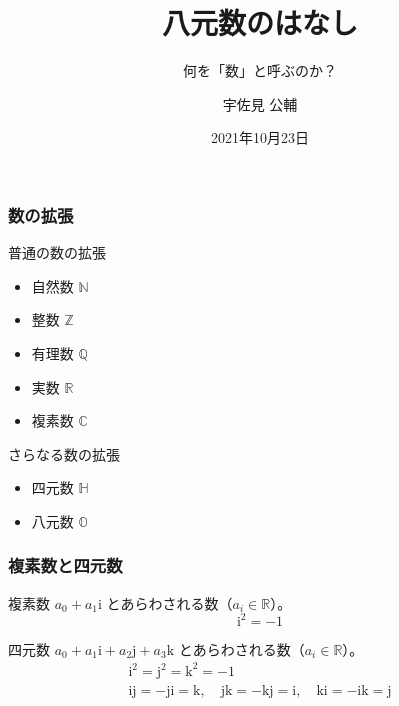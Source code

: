 \documentclass{beamer}
\title{八元数のはなし}
\subtitle{何を「数」と呼ぶのか？}
\author{宇佐見 公輔}
\date{2021年10月23日}
\newcommand{\ii}{\mathrm{i}}
\newcommand{\jj}{\mathrm{j}}
\newcommand{\kk}{\mathrm{k}}
\begin{document}
\maketitle

\begin{frame}
    \frametitle{数の拡張}

    \begin{block}{普通の数の拡張}
        \begin{itemize}
            \item 自然数 \(\mathbb{N}\)
            \item 整数 \(\mathbb{Z}\)
            \item 有理数 \(\mathbb{Q}\)
            \item 実数 \(\mathbb{R}\)
            \item 複素数 \(\mathbb{C}\)
        \end{itemize}
    \end{block}

    \begin{block}{さらなる数の拡張}
        \begin{itemize}
            \item 四元数 \(\mathbb{H}\)
            \item 八元数 \(\mathbb{O}\)
        \end{itemize}
    \end{block}
\end{frame}

\begin{frame}
    \frametitle{複素数と四元数}

    \begin{block}{複素数}
        \(a_0 + a_1 \ii\)
        とあらわされる数（\(a_i \in \mathbb{R}\)）。
        \[
            \ii^2 = -1
        \]
    \end{block}

    \begin{block}{四元数}
        \(a_0 + a_1 \ii + a_2 \jj + a_3 \kk\)
        とあらわされる数（\(a_i \in \mathbb{R}\)）。
        \begin{gather*}
            \ii^2 = \jj^2 = \kk^2 = -1 \\
            \ii \jj = -\jj \ii = \kk, \quad \jj \kk = -\kk \jj = \ii, \quad \kk \ii = -\ii \kk = \jj
        \end{gather*}
    \end{block}
\end{frame}
\end{document}
